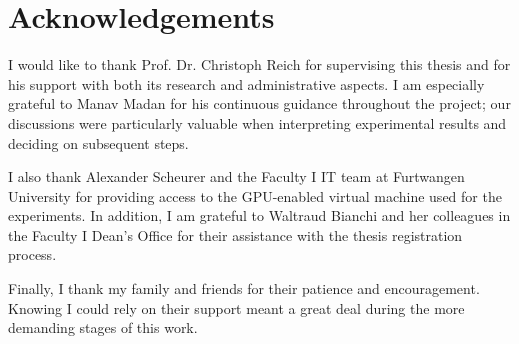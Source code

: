 \chapter*{Acknowledgements}

I would like to thank Prof. Dr. Christoph Reich for supervising this thesis and for his support with both its research and administrative aspects. I am especially grateful to Manav Madan for his continuous guidance throughout the project; our discussions were particularly valuable when interpreting experimental results and deciding on subsequent steps.

I also thank Alexander Scheurer and the Faculty I IT team at Furtwangen University for providing access to the GPU-enabled virtual machine used for the experiments. In addition, I am grateful to Waltraud Bianchi and her colleagues in the Faculty I Dean's Office for their assistance with the thesis registration process.

Finally, I thank my family and friends for their patience and encouragement. Knowing I could rely on their support meant a great deal during the more demanding stages of this work.
